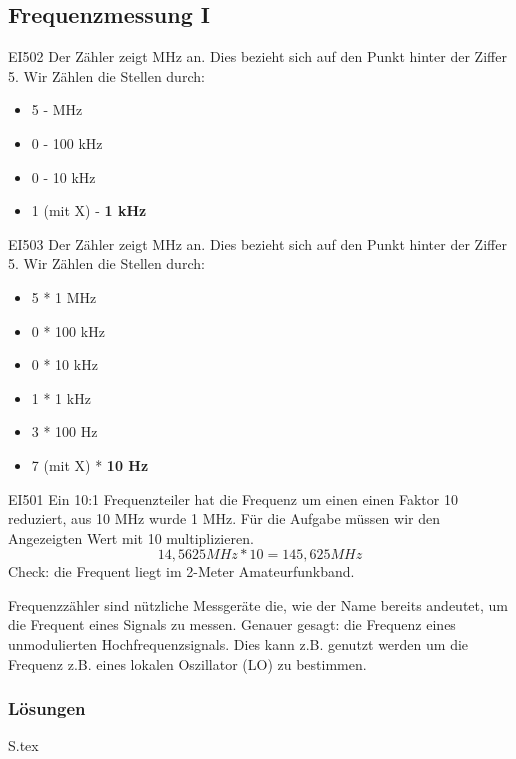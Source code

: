 \documentclass[10pt,a4paper,ngerman]{article}
\theoremstyle{definition}
\theoremstyle{plain}
\theoremstyle{mytheorem}
\theoremstyle{definition}
\newenvironment{ohmchapter}{}
{
  \subsubsection*{Lösungen}
  S\arabic{subsection}.tex}
}
\begin{document}
\subsection{Frequenzmessung I}


\begin{sol}{EI502}
Der Zähler zeigt MHz an. Dies bezieht sich auf den Punkt hinter der Ziffer 5.
Wir Zählen die Stellen durch:
\begin{itemize}
  \item 5 - MHz
  \item 0 - 100 kHz
  \item 0 - 10 kHz
  \item 1 (mit X) - \textbf{1 kHz}
\end{itemize}
\end{sol} 

\begin{sol}{EI503}
Der Zähler zeigt MHz an. Dies bezieht sich auf den Punkt hinter der Ziffer 5.
Wir Zählen die Stellen durch:
\begin{itemize}
  \item 5 * 1 MHz
  \item 0 * 100 kHz
  \item 0 * 10 kHz
  \item 1 * 1 kHz
  \item 3 * 100 Hz
  \item 7 (mit X) * \textbf{10 Hz}
\end{itemize}
\end{sol} 

\begin{sol}{EI501}
 Ein 10:1 Frequenzteiler hat die Frequenz um einen einen Faktor 10 reduziert, aus 10 MHz wurde 1 MHz.
 Für die Aufgabe müssen wir den Angezeigten Wert mit 10 multiplizieren.
 $$ 14,5625 MHz * 10 = 145,625 MHz $$
 Check: die Frequent liegt im 2-Meter Amateurfunkband.
\end{sol}  


\begin{ohmchapter}
Frequenzzähler sind nützliche Messgeräte die, wie der Name bereits andeutet, um die Frequent eines Signals zu messen. Genauer gesagt: die Frequenz eines unmodulierten Hochfrequenzsignals.  Dies kann z.B. genutzt werden um die Frequenz z.B. eines lokalen Oszillator (LO) zu bestimmen.  
\end{ohmchapter}  
\end{document}
